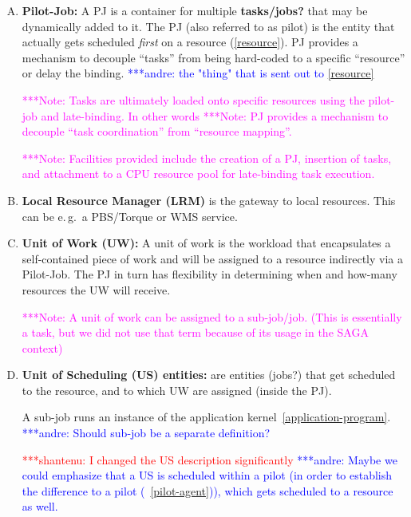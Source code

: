 \documentclass[conference,final]{IEEEtran}
\newcommand{\jhanote}[1]{ {\textcolor{red} { ***shantenu: #1 }}}
\newcommand{\alnote}[1]{ {\textcolor{blue} { ***andre: #1 }}}
\newcommand{\note}[1]{ {\textcolor{magenta} { ***Note: #1 }}}
\newcommand{\alnote}[1]{}
\newcommand{\jhanote}[1]{}
\newcommand{\note}[1]{}
\begin{document}
\begin{enumerate}[A.]

\item\textbf{Pilot-Job:} A PJ is a container for multiple
  \textbf{tasks/jobs?}  that may be dynamically added to it. The PJ
  (also referred to as pilot) is the entity that actually gets
  scheduled {\it first} on a resource (\ref{resource}).  PJ provides a
  mechanism to decouple “tasks'' from being hard-coded to a specific
  “resource'' or delay the binding. \alnote{ the "thing" that is sent
    out to \ref{resource}} \label{pilot-agent}

  \note{Tasks are ultimately loaded onto specific resources using the
    pilot-job and late-binding. In other words} \note{PJ provides a
    mechanism to decouple “task coordination” from “resource
    mapping”.}

  \note{Facilities provided include the creation of a PJ, insertion of
    tasks, and attachment to a CPU resource pool for late-binding task
    execution.}

\item \textbf{Local Resource Manager (LRM)} is the gateway to local resources. 
This can be e.\,g.\ a PBS/Torque or WMS service.

\item \textbf{Unit of Work (UW):} A unit of work is the workload that 
    encapsulates a self-contained piece of work and will be assigned to a 
    resource indirectly via a Pilot-Job.  The PJ in turn has flexibility in 
    determining when and how-many resources the UW will receive.


  \note{A unit of work can be assigned to a sub-job/job. (This is
    essentially a task, but we did not use that term because of its
    usage in the SAGA context)}
    

\item \textbf{Unit of Scheduling (US) entities:} are entities (jobs?)
  that get scheduled to the resource, and to which UW are assigned
  (inside the PJ).


  A sub-job runs an instance of the application
  kernel~\ref{application-program}. \alnote{Should sub-job be a
    separate definition?}

\jhanote{I changed the US description significantly} \alnote{Maybe we could 
emphasize that a US is scheduled within a pilot (in order to establish the 
difference to a pilot (~\ref{pilot-agent})), which gets scheduled to a resource 
as well.}



\end{enumerate}
\end{document}
